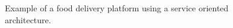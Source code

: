 \begin{figure}[]
  \centering
  
  \caption{Example of a food delivery platform using a service oriented architecture.}
  \label{fig:service-oriented-architecture}
\end{figure}